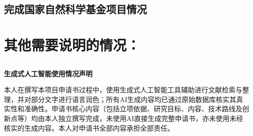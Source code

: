\documentclass[UTF8,zihao=-4]{ctexart} %
\begin{document}
  \subsection[（对申请人负责的前一个已资助期满的科学基金项目（项目名称及批准号）完成情况、后续研究进展及与本申请项目的关系加以详细说明。另附该项目的研究工作总结摘要（限500字）和相关成果详细目录）。]{完成国家自然科学基金项目情况}
  \section{其他需要说明的情况：}
  \subsection[申请人同年申请不同类型的国家自然科学基金项目情况（列明同年申请的其他项目的项目类型、项目名称信息，并说明与本项目之间的区别与联系；已收到自然科学基金委不予受理或不予资助决定的，无需列出）。]{}
  \subsection[具有高级专业技术职务（职称）的申请人或者主要参与者是否存在同年申请或者参与申请国家自然科学基金项目的单位不一致的情况；如存在上述情况，列明所涉及人员的姓名，申请或参与申请的其他项目的项目类型、项目名称、单位名称、上述人员在该项目中是申请人还是参与者，并说明单位不一致原因。]{}
  \subsection[具有高级专业技术职务（职称）的申请人或者主要参与者是否存在与正在承担的国家自然科学基金项目的单位不一致的情况；如存在上述情况，列明所涉及人员的姓名，正在承担项目的批准号、项目类型、项目名称、单位名称、起止年月，并说明单位不一致原因。]{}
  \subsection[申请人和主要参与者同年以不同专业技术职务（职称）申请或参与申请科学基金项目的情况（应详细说明原因）。]{}
  \subsection[其他。]{}
  \textbf{生成式人工智能使用情况声明}

  本人在撰写本项目申请书过程中，使用生成式人工智能工具辅助进行文献检索与整理，并对部分文字进行语言润色；所有AI生成内容均已通过原始数据库核实其真实性和准确性。申请书核心内容（包括立项依据、研究目标、内容、技术路线及创新点等）均由本人独立撰写完成，未使用AI直接生成完整申请书，亦未使用未经核实的生成内容。本人对申请书全部内容承担全部责任。
  \mnsfcWordCount
\end{document}

